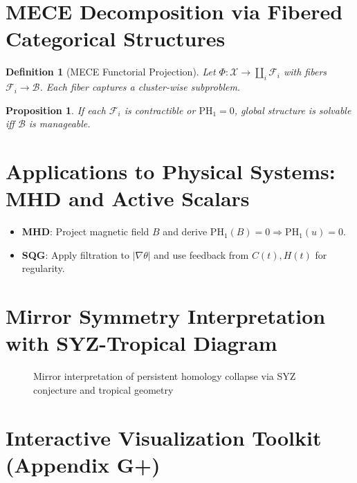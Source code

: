 \documentclass[11pt]{article}
\newtheorem{definition}[theorem]{Definition}
\newtheorem{proposition}[theorem]{Proposition}
\begin{document}
\section{MECE Decomposition via Fibered Categorical Structures}

\begin{definition}[MECE Functorial Projection]
Let \( \Phi: \mathcal{X} \to \coprod_i \mathcal{F}_i \) with fibers \( \mathcal{F}_i \to \mathcal{B} \). Each fiber captures a cluster-wise subproblem.
\end{definition}

\begin{proposition}
If each \( \mathcal{F}_i \) is contractible or \( \mathrm{PH}_1 = 0 \), global structure is solvable iff \( \mathcal{B} \) is manageable.
\end{proposition}

\section{Applications to Physical Systems: MHD and Active Scalars}

\begin{itemize}
  \item \textbf{MHD}: Project magnetic field \( B \) and derive \( \mathrm{PH}_1(B) = 0 \Rightarrow \mathrm{PH}_1(u) = 0 \).
  \item \textbf{SQG}: Apply filtration to \( |\nabla \theta| \) and use feedback from \( C(t), H(t) \) for regularity.
\end{itemize}

\section{Mirror Symmetry Interpretation with SYZ-Tropical Diagram}

\begin{figure}[h!]
\centering
{}
\caption{Mirror interpretation of persistent homology collapse via SYZ conjecture and tropical geometry}
\end{figure}

\section{Interactive Visualization Toolkit (Appendix G+)}
\end{document}
